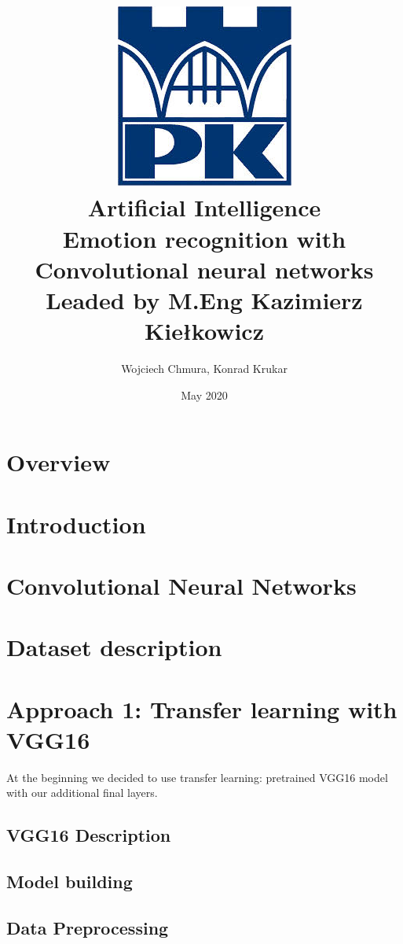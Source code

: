 \documentclass{article}
\title{
    {\includegraphics{./images/logo_pk.jpg}}\\
    {Artificial Intelligence}\\
    {\large Emotion recognition with Convolutional neural networks}\\
     \small Leaded by M.Eng Kazimierz Kiełkowicz
    }
\author{Wojciech Chmura, Konrad Krukar}
\date{May 2020}
\begin{document}
    \maketitle
    \newpage
    \tableofcontents
    \newpage
    
    \section{Overview}
    
    
    \section{Introduction}
        
    
    \section{Convolutional Neural Networks}
        
    
    \section{Dataset description}
    
    
    \newpage
    \section{Approach 1: Transfer learning with VGG16}
    At the beginning we decided to use transfer learning: pretrained VGG16 model with our additional final layers.
 
    	\subsection{VGG16 Description}
    	
    	
    	\newpage
    	\subsection{Model building}
    	
    
    	\newpage
    	\subsection{Data Preprocessing}
    	
    	
\end{document}
